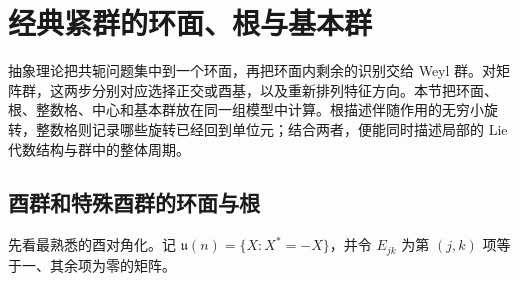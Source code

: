 
% 
% 
% 

\section{经典紧群的环面、根与基本群}
\label{g1:sec:1905}

抽象理论把共轭问题集中到一个环面，再把环面内剩余的识别交给 Weyl 群。对矩阵群，这两步分别对应选择正交或酉基，以及重新排列特征方向。本节把环面、根、整数格、中心和基本群放在同一组模型中计算。根描述伴随作用的无穷小旋转，整数格则记录哪些旋转已经回到单位元；结合两者，便能同时描述局部的 Lie 代数结构与群中的整体周期。

\subsection{酉群和特殊酉群的环面与根}
\label{g1:subsec:1905:01}
先看最熟悉的酉对角化。记 \(\mathfrak u(n)=\{X:X^*=-X\}\)，并令 \(E_{jk}\) 为第 \((j,k)\) 项等于一、其余项为零的矩阵。

